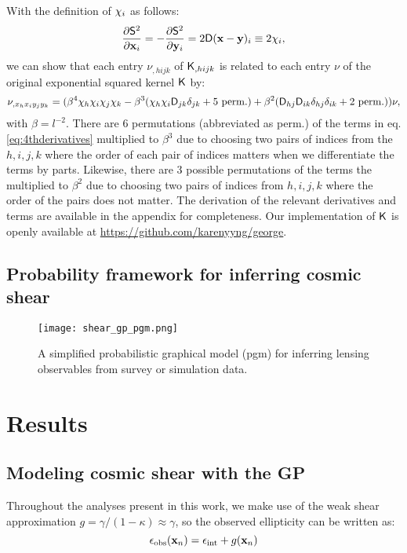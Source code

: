 With the definition of ${\bf \chi}_i$ as follows:
\begin{equation}
	\frac{\partial \mathsf{S}^2}{\partial \mathbf{x}_i} = -\frac{\partial
	\mathsf{S}^2}{\partial \mathbf{y}_i} =
	2 \mathsf{D}(\mathbf{x} - \mathbf{y})_i \equiv 2{\bf \chi}_i,
\end{equation}
we can show that each entry $\nu_{,hijk}$ of $\mathsf{K}_{,hijk}$ is
related to each entry $\nu$ of the original exponential squared kernel
$\mathsf{K}$ by:
\begin{equation}
\nu_{,x_h x_i y_j y_k} = (\beta^4 \chi_h \chi_i \chi_j \chi_k -
\beta^3 (\chi_h \chi_i \mathsf{D}_{jk} \delta_{jk} + 5~{\rm perm.}) + \beta^2
(\mathsf{D}_{hj} \mathsf{D}_{ik}\delta_{hj}\delta_{ik} + 2~{\rm perm.})) \nu,
\label{eq:4thderivatives}
\end{equation}
with $\beta = l^{-2}$. There are 6 permutations (abbreviated as perm.) of the terms in
eq. \ref{eq:4thderivatives}
multiplied to $\beta^3$ due
to choosing two pairs of indices from the $h,i,j,k$ where the order of each
pair of indices matters when we differentiate the terms by parts. 
Likewise, there are 3 possible permutations of
the terms the multiplied to $\beta^2$ due to choosing two pairs of indices from
$h, i, j, k$ where the order of the pairs does not matter.
The derivation of the relevant derivatives and terms are available 
in the appendix for completeness. 
Our implementation of $\mathsf{K}$ is openly available at
\href{https://github.com/karenyyng/george}{https://github.com/karenyyng/george}.


\subsection{Probability framework for inferring cosmic shear}
\begin{figure}
	\centering
	\texttt{[image: shear\_gp\_pgm.png]}
	\caption{A simplified probabilistic graphical model (pgm) for inferring
		lensing observables from survey or simulation data.
		\label{fig:simplified_pgm}}
\end{figure}






\section{Results}



\subsection{Modeling cosmic shear with the GP}
Throughout the analyses present in this work, 
we make use of the weak shear approximation 
$g = \gamma / (1 - \kappa)  \approx \gamma$, so the observed ellipticity can be
written as: 
\begin{equation}
	\epsilon_{\rm obs}(\mathbf{x}_n) = \epsilon_{\rm int} + g(\mathbf{x}_n) 
\end{equation}
 
